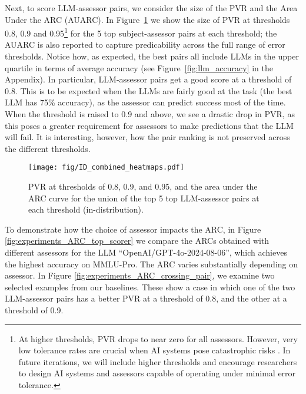 \documentclass[11pt]{article}
\begin{document}
Next, to score LLM-assessor pairs, we consider the size of the PVR and the Area Under the ARC (AUARC). %
In Figure~\ref{fig:experiments_PPR} we show the size of PVR at thresholds 0.8, 0.9 and 0.95\footnote{At higher thresholds, PVR drops to near zero for all assessors. However, very low tolerance rates are crucial when AI systems pose catastrophic risks \citep{hendrycks2023overviewcatastrophicairisks}. In future iterations, we will include higher thresholds and encourage researchers to design AI systems and assessors capable of operating under minimal error tolerance.} for the 5 top subject-assessor pairs at each threshold; the AUARC is also reported to capture predicability across the full range of error thresholds. Notice how, as expected, the best pairs all include LLMs in the upper quartile in terms of average accuracy (see Figure~\ref{fig:llm_accuracy} in the Appendix). In particular,  LLM-assessor pairs get a good score at a threshold of 0.8. This is to be expected when the LLMs are fairly good at the task (the best LLM has 75\% accuracy), as the assessor can predict success most of the time. When the threshold is raised to 0.9 and above, we see a drastic drop in PVR, as this poses a greater requirement for assessors to make predictions that the LLM will fail. It is interesting, however, how the pair ranking is not preserved across the different thresholds.






\begin{figure}[tb]
    \texttt{[image: fig/ID\_combined\_heatmaps.pdf]}%
\caption{PVR at thresholds of 0.8, 0.9, and 0.95, and the area under the ARC curve for the union of the top 5 top LLM-assessor pairs at each threshold (in-distribution).}
        \label{fig:experiments_PPR}
\end{figure}





To demonstrate how the choice of assessor impacts the ARC, in Figure \ref{fig:experiments_ARC_top_scorer} we compare the ARCs obtained with different assessors for the LLM ``OpenAI/GPT-4o-2024-08-06'', which achieves the highest accuracy on MMLU-Pro. The ARC varies substantially depending on assessor. In Figure \ref{fig:experiments_ARC_crossing_pair}, we examine two selected examples from our baselines. These show a case in which one of the two LLM-assessor pairs has a better PVR at a threshold of 0.8, and the other at a threshold of 0.9.
\end{document}

